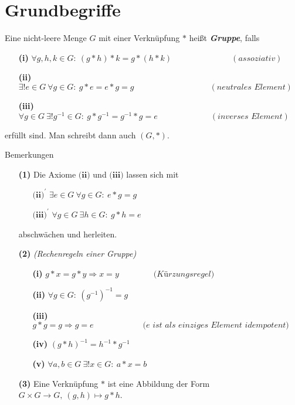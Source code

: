 \section{Grundbegriffe}

\begin{df}\label{1.1}
Eine nicht-leere Menge $G$ mit einer Verknüpfung $\ast$
heißt \textbf{\textit{Gruppe}}, falls
\begin{enumerate}
\item[\textbf{(i)}]
$\forall g,h,k \in G: \ (g \ast h) \ast k = g \ast (h \ast k) \ \quad  \quad \quad \quad \quad \quad \quad
  (\textit{assoziativ}) $   
\item[\textbf{(ii)}] 
$\exists ! e \in G \ \forall g \in G: \ g \ast e = e \ast g  = g  \  \quad  \quad \quad \quad \quad \quad \quad \quad \quad  (\textit{neutrales Element}) $   
\item[\textbf{(iii)}]
$\forall g \in G \ \exists ! g^{-1} \in G: \ g \ast g^{-1} = g^{-1} \ast g = e \ \  \quad \quad \quad \quad \quad \quad (\textit{inverses Element})$  
\end{enumerate}
erfüllt sind. Man schreibt dann auch $(G,\ast)$.
\end{df}



\begin{generic_no_num}{Bemerkungen}
\ 
\begin{enumerate}
\item[\textbf{(1)}]
Die Axiome $\textbf{(ii)}$ und $\textbf{(iii)}$ lassen sich mit
\begin{enumerate}
\item[$ \textbf{(ii)}^\prime $]
$\exists e \in G \ \forall g \in G : \ e \ast g = g$
\item[$ \textbf{(iii)}^\prime $]
$\forall g \in G  \ \exists h \in G : \ g \ast h = e$
\end{enumerate}
abschwächen und herleiten.
\item[\textbf{(2)}]
\textit{(Rechenregeln einer Gruppe)}
\begin{enumerate}
\item[ \textbf{(i)}]
$g  \ast x = g \ast y  \Rightarrow x = y  \qquad \qquad \ \textit{(Kürzungsregel)}$
\item[ \textbf{(ii)}]
$\forall g \in G : \ (g^{-1})^{-1} = g $
\item[\textbf{(iii)}]
$g \ast g = g \Rightarrow g = e  \qquad \qquad \qquad \textit{($e$ ist als einziges Element idempotent)}$
\item[\textbf{(iv)}]
$(g \ast h)^{-1} = h^{-1} \ast g^{-1}$
\item[\textbf{(v)}]
$\forall a,b \in G \ \exists ! x \in G : \ a \ast x = b$
\end{enumerate}
\item[\textbf{(3)}]
Eine Verknüpfung $\ast$ ist eine Abbildung der Form	$G \times G \to G , \ (g,h) \mapsto g \ast h$.
\end{enumerate}

\end{generic_no_num}

